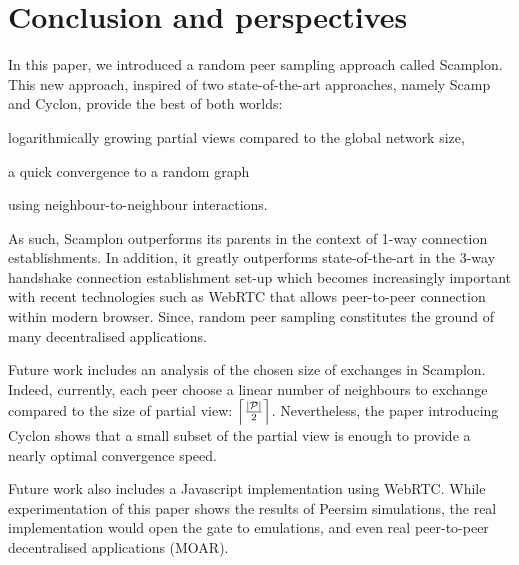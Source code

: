 
\section{Conclusion and perspectives}
\label{sec:conclusion}

In this paper, we introduced a random peer sampling approach called Scamplon.
This new approach, inspired of two state-of-the-art approaches, namely Scamp
and Cyclon, provide the best of both worlds:
\begin{inparaenum}
\item logarithmically growing partial views compared to the global network
  size,
\item a quick convergence to a random graph
\item using neighbour-to-neighbour interactions.
\end{inparaenum}
As such, Scamplon outperforms its parents in the context of 1-way connection
establishments. In addition, it greatly outperforms state-of-the-art in the
3-way handshake connection establishment set-up which becomes increasingly
important with recent technologies such as WebRTC that allows peer-to-peer
connection within modern browser. Since, random peer sampling constitutes the
ground of many decentralised applications.

Future work includes an analysis of the chosen size of exchanges in
Scamplon. Indeed, currently, each peer choose a linear number of neighbours to
exchange compared to the size of partial view:
$\left\lceil |\mathcal{P}|\over{2} \right\rceil$. Nevertheless, the paper
introducing Cyclon shows that a small subset of the partial view is enough to
provide a nearly optimal convergence speed.

Future work also includes a Javascript implementation using WebRTC. While
experimentation of this paper shows the results of Peersim simulations, the
real implementation would open the gate to emulations, and even real
peer-to-peer decentralised applications (MOAR).

